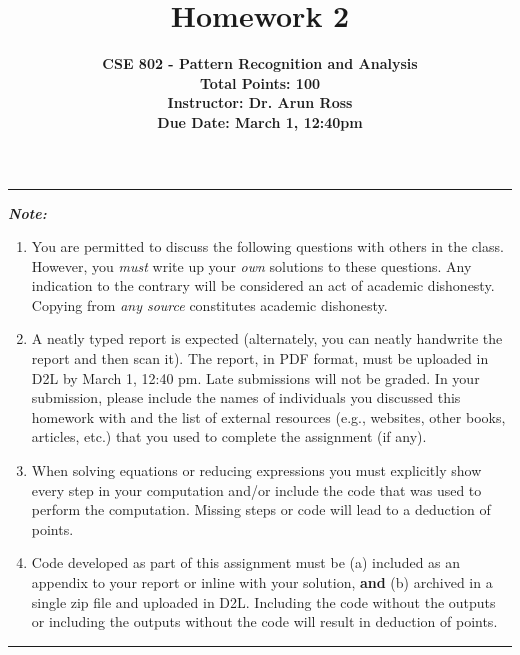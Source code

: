 \documentclass[11pt]{article}
\title{\bf Homework 2}
\author{{\bf \normalsize CSE 802 - Pattern Recognition and Analysis} \\
{\bf \normalsize Total Points: 100} \\
{\bf \normalsize Instructor: Dr. Arun Ross} \\
{\bf \normalsize Due Date: March 1, 12:40pm}}
\date{}
\begin{document}
\maketitle

\noindent \rule{7in}{1pt}

{\em \bf \small Note:

\begin{enumerate}
\item You are permitted to discuss the following questions with others in the class. However, you {\em must} write up your {\em own} solutions to these questions. Any indication to
the contrary will be considered an act of academic dishonesty. Copying from {\em any source} constitutes academic dishonesty. 
\item A neatly typed report is expected (alternately, you can neatly handwrite the report and then scan it). The report, in PDF format, must be uploaded in D2L by March 1, 12:40 pm. Late submissions will not be graded.  In your submission, please include the names of individuals you discussed this homework with and the list of external resources (e.g., websites, other books, articles, etc.) that you used to complete the assignment (if any). 
\item When solving equations or reducing expressions you must explicitly show every step in your computation and/or include the code that was used to perform the computation. Missing steps or code will lead to a deduction of points. 
\item Code developed as part of this assignment must be (a) included as an appendix to your report or inline with your solution, {\bf and} (b) archived in a single zip file and uploaded in D2L. Including the code without the outputs or including the outputs without the code will result in deduction of points.
\end{enumerate}
}
\noindent \rule{7in}{1pt}
\end{document}
